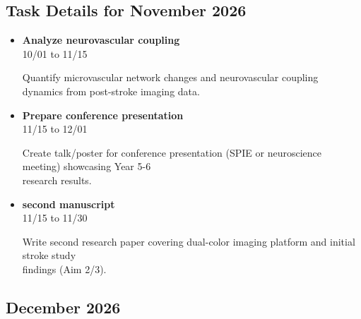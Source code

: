 \documentclass[landscape,a4paper]{article}
\begin{document}
\subsection{Task Details for November 2026}
\begin{itemize}[leftmargin=1cm, itemsep=0.8em]
    \item \textcolor{other}{\textbf{Analyze neurovascular coupling}}\\[0.2em]
          \textcolor{black!70}{\small 10/01 to 11/15}
\\[0.3em]
          \begin{minipage}[t]{0.85\textwidth}
          \textcolor{black!80}{Quantify microvascular network changes and neurovascular coupling dynamics from post-stroke imaging data.}
          \end{minipage}

    \item \textcolor{researchout}{\textbf{Prepare conference presentation}}\\[0.2em]
          \textcolor{black!70}{\small 11/15 to 12/01}
\\[0.3em]
          \begin{minipage}[t]{0.85\textwidth}
          \textcolor{black!80}{Create talk/poster for conference presentation (SPIE or neuroscience meeting) showcasing Year 5-6\\[0.1em]
          research results.}
          \end{minipage}

    \item \textcolor{researchout}{\textbf{second manuscript}}\\[0.2em]
          \textcolor{black!70}{\small 11/15 to 11/30}
\\[0.3em]
          \begin{minipage}[t]{0.85\textwidth}
          \textcolor{black!80}{Write second research paper covering dual-color imaging platform and initial stroke study\\[0.1em]
          findings (Aim 2/3).}
          \end{minipage}

\end{itemize}

\subsection*{December 2026}
\vspace{0.5cm}
\end{document}
